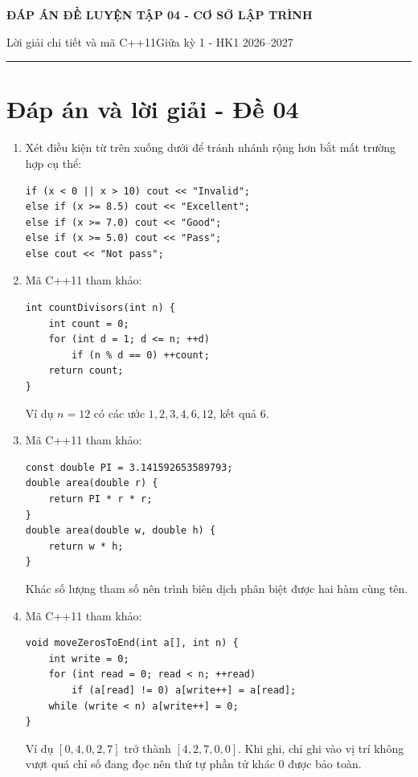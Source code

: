 \documentclass[11pt,a4paper]{article}
\newcommand{\examtitle}[4]{\begin{center}{\Large\bfseries\color{hcmusblue}#1}\par\vspace{3pt}{\large\bfseries #2}\par\vspace{3pt}\small #3\quad\textbullet\quad #4\end{center}\vspace{5pt}\hrule\vspace{8pt}}
\begin{document}
\small
\examtitle{ĐÁP ÁN ĐỀ LUYỆN TẬP 04 - CƠ SỞ LẬP TRÌNH}{CƠ SỞ LẬP TRÌNH - HCMUS (theo lịch học tuần 1--5)}{Lời giải chi tiết và mã C++11}{Giữa kỳ 1 - HK1 2026--2027}

\section*{Đáp án và lời giải - Đề 04}
\begin{enumerate}
\item \begin{minipage}[t]{\linewidth}
Xét điều kiện từ trên xuống dưới để tránh nhánh rộng hơn bắt mất trường hợp cụ thể:
\begin{lstlisting}
if (x < 0 || x > 10) cout << "Invalid";
else if (x >= 8.5) cout << "Excellent";
else if (x >= 7.0) cout << "Good";
else if (x >= 5.0) cout << "Pass";
else cout << "Not pass";
\end{lstlisting}
\end{minipage}
\item \begin{minipage}[t]{\linewidth}
Mã C++11 tham khảo:
\begin{lstlisting}
int countDivisors(int n) {
    int count = 0;
    for (int d = 1; d <= n; ++d)
        if (n % d == 0) ++count;
    return count;
}
\end{lstlisting}
Ví dụ $n=12$ có các ước $1,2,3,4,6,12$, kết quả 6.
\end{minipage}
\item \begin{minipage}[t]{\linewidth}
Mã C++11 tham khảo:
\begin{lstlisting}
const double PI = 3.141592653589793;
double area(double r) {
    return PI * r * r;
}
double area(double w, double h) {
    return w * h;
}
\end{lstlisting}
Khác số lượng tham số nên trình biên dịch phân biệt được hai hàm cùng tên.
\end{minipage}
\item \begin{minipage}[t]{\linewidth}
Mã C++11 tham khảo:
\begin{lstlisting}
void moveZerosToEnd(int a[], int n) {
    int write = 0;
    for (int read = 0; read < n; ++read)
        if (a[read] != 0) a[write++] = a[read];
    while (write < n) a[write++] = 0;
}
\end{lstlisting}
Ví dụ $[0,4,0,2,7]$ trở thành $[4,2,7,0,0]$. Khi ghi, chỉ ghi vào vị trí không vượt quá chỉ số đang đọc nên thứ tự phần tử khác 0 được bảo toàn.

\end{minipage}
\end{enumerate}
\end{document}
